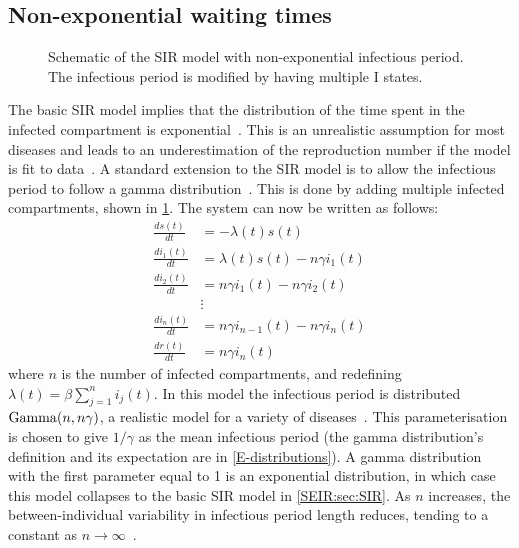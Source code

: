 \documentclass[thesis.tex]{subfiles}
\begin{document}
\subsection{Non-exponential waiting times} \label{SEIR:sec:non-exponential}
\begin{figure}[h]
  \caption[The SIR model with non-exponential infectious period]{Schematic of the SIR model with non-exponential infectious period. The infectious period is modified by having multiple I states.}
  \label{SEIR:fig:SIR-gamma}
\end{figure}

The basic SIR model implies that the distribution of the time spent in the infected compartment is exponential~\autocite[96]{keelingModeling}.
This is an unrealistic assumption for most diseases and leads to an underestimation of the reproduction number if the model is fit to data~\autocites{lloydRealistic}{wearingAppropriate}.
A standard extension to the SIR model is to allow the infectious period to follow a gamma distribution~\autocite[94]{keelingModeling}.
This is done by adding multiple infected compartments, shown in \cref{SEIR:fig:SIR-gamma}.
The system can now be written as follows:
\begin{align}
\frac{ds(t)}{dt} &= -\lambda(t) s(t)\\
\frac{di_1(t)}{dt} &= \lambda(t) s(t) - n\gamma i_1(t) \\
\frac{di_2(t)}{dt} &= n\gamma i_1(t) - n \gamma i_2(t) \\
&\vdots \nonumber \\
\frac{di_n(t)}{dt} &= n\gamma i_{n-1}(t) - n \gamma i_n(t) \\
\frac{dr(t)}{dt} &= n\gamma i_n(t)
\end{align}
where $n$ is the number of infected compartments, and redefining $\lambda(t) = \beta \sum_{j=1}^n i_j(t)$.
In this model the infectious period is distributed $\operatorname{Gamma}(n, n\gamma)$, a realistic model for a variety of diseases~\autocite{wearingAppropriate}.
This parameterisation is chosen to give $1/\gamma$ as the mean infectious period (the gamma distribution's definition and its expectation are in \cref{E-distributions}).
A gamma distribution with the first parameter equal to 1 is an exponential distribution, in which case this model collapses to the basic SIR model in \cref{SEIR:sec:SIR}.
As $n$ increases, the between-individual variability in infectious period length reduces, tending to a constant as $n \to \infty$~\autocite{lloydRealistic}.
\end{document}
